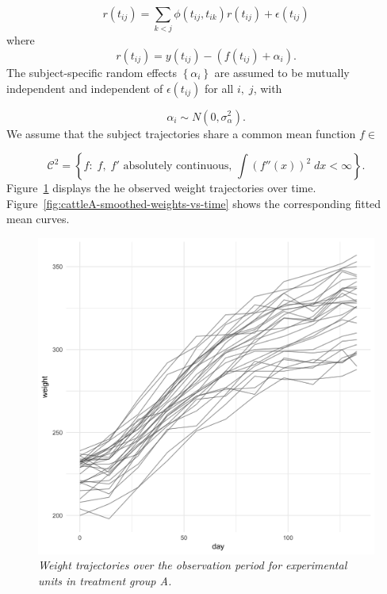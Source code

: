 \begin{equation} \label{eq:cattleA-dynamic-cond-mixed-model-1}
r\left(t_{ij}\right) = \sum_{k < j} \phi\left( t_{ij}, t_{ik} \right) r\left(t_{ij}\right) + \epsilon\left(t_{ij}\right)
\end{equation}
\noindent
where
\begin{equation} \label{eq:cattleA-dynamic-cond-mixed-model-2}
r\left(t_{ij}\right) = y\left(t_{ij}\right) - \left(f\left(t_{ij} \right) + \alpha_{i}\right).
\end{equation}
\noindent
The subject-specific random effects $\left\{ \alpha_i \right\}$ are assumed to be mutually independent and independent of $ \epsilon\left(t_{ij}\right)$ for all $i,\;j$, with

\[
\alpha_i \sim N\left( 0, \sigma_\alpha^2 \right).
\]
\noindent
We assume that the subject trajectories share a common mean function $f \in $

\[
\mathcal{C}^2 = \left\{f: \; f,\;f' \mbox{ absolutely continuous, } \int\left(f''\left(x\right)\right)^2 \;dx < \infty  \right\}.
\]
\noindent
Figure~\ref{fig:cattleA-weights-vs-time} displays the he observed weight trajectories over time. Figure~\ref{fig:cattleA-smoothed-weights-vs-time} shows the corresponding fitted mean curves.

\begin{figure}[H] 
\begin{center}
    \includegraphics[width=\textwidth]{img/cattle/cattleA-weights-vs-time}
\end{center}
 \caption{\textit{Weight trajectories over the observation period for experimental units in treatment group A.}}\label{fig:cattleA-weights-vs-time}
 \end{figure}

